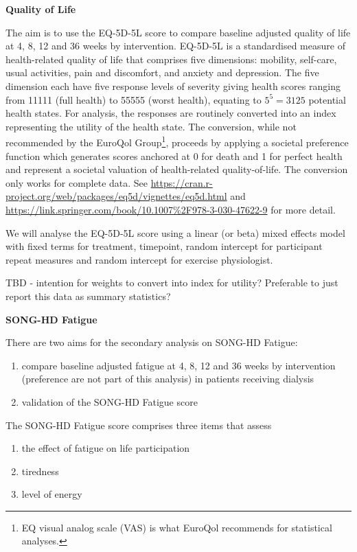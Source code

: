 \documentclass[
]{article}
\begin{document}
\textbf{Quality of Life}

The aim is to use the EQ-5D-5L score to compare baseline adjusted quality of life at 4, 8, 12 and 36 weeks by intervention.
EQ-5D-5L is a standardised measure of health-related quality of life that comprises five dimensions: mobility, self-care, usual activities, pain and discomfort, and anxiety and depression.
The five dimension each have five response levels of severity giving health scores ranging from 11111 (full health) to 55555 (worst health), equating to $5^5 = 3125$ potential health states.
For analysis, the responses are routinely converted into an index representing the utility of the health state.
The conversion, while not recommended by the EuroQol Group\footnote{EQ visual analog scale (VAS) is what EuroQol recommends for statistical analyses.}, proceeds by applying a societal preference function which generates scores anchored at 0 for death and 1 for perfect health and represent a societal valuation of health-related quality-of-life.
The conversion only works for complete data.
See \url{https://cran.r-project.org/web/packages/eq5d/vignettes/eq5d.html} and \url{https://link.springer.com/book/10.1007\%2F978-3-030-47622-9} for more detail.

We will analyse the EQ-5D-5L score using a linear (or beta) mixed effects model with fixed terms for treatment, timepoint, random intercept for participant repeat measures and random intercept for exercise physiologist.

TBD - intention for weights to convert into index for utility? Preferable to just report this data as summary statistics?


\textbf{SONG-HD Fatigue}

There are two aims for the secondary analysis on SONG-HD Fatigue:

\begin{enumerate}
    \item compare baseline adjusted fatigue at 4, 8, 12 and 36 weeks by intervention (preference are not part of this analysis) in patients receiving dialysis
    \item validation of the SONG-HD Fatigue score
\end{enumerate}

The SONG-HD Fatigue score comprises three items that assess
\begin{enumerate}
    \item the effect of fatigue on life participation
    \item tiredness
    \item level of energy
\end{enumerate}
\end{document}
